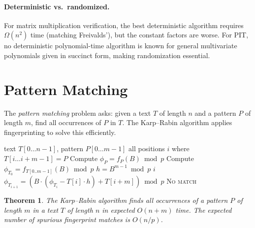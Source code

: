 \documentclass[twoside,12pt]{book}
\theoremstyle{plain}
\newtheorem{theorem}{Theorem}[chapter]
\theoremstyle{definition}
\theoremstyle{remark}
\begin{document}
\paragraph{Deterministic vs.\ randomized.}
For matrix multiplication verification, the best deterministic algorithm requires $\Omega(n^2)$ time (matching Freivalds'), but the constant factors are worse. For PIT, no deterministic polynomial-time algorithm is known for general multivariate polynomials given in succinct form, making randomization essential.


\section{Pattern Matching}
\label{sec:pattern-matching}

The \emph{pattern matching} problem asks: given a text $T$ of length $n$ and a pattern $P$ of length $m$, find all occurrences of $P$ in $T$. The Karp--Rabin algorithm applies fingerprinting to solve this efficiently.

\begin{algorithm}[H]
\caption{Karp--Rabin Pattern Matching}
\label{alg:karp-rabin}
\begin{algorithmic}[1]
\Require text $T[0 \ldots n-1]$, pattern $P[0 \ldots m-1]$
\Ensure all positions $i$ where $T[i \ldots i+m-1] = P$
\State Compute $\phi_P = f_P(B) \bmod p$ 
\State Compute $\phi_{T_0} = f_{T[0..m-1]}(B) \bmod p$ 
\State $h = B^{m-1} \bmod p$ 
    \State {}
      \State \Return $i$
    \EndIf
  \EndIf
    \State $\phi_{T_{i+1}} = (B \cdot (\phi_{T_i} - T[i] \cdot h) + T[i+m]) \bmod p$
  \EndIf
\EndFor
\State \Return \textsc{No match}
\end{algorithmic}
\end{algorithm}

\begin{theorem}
\label{thm:karp-rabin}
The Karp--Rabin algorithm finds all occurrences of a pattern $P$ of length $m$ in a text $T$ of length $n$ in expected $O(n + m)$ time. The expected number of spurious fingerprint matches is $O(n/p)$.
\end{theorem}
\end{document}
